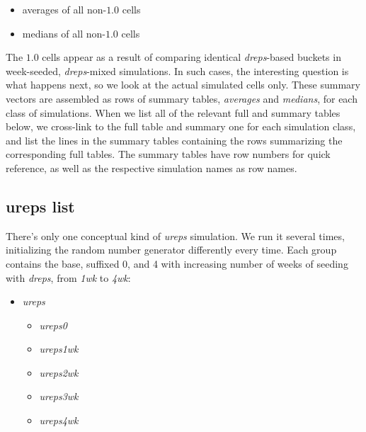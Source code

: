 \documentclass[10pt,oneside]{memoir}
\begin{document}
\begin{Spacing}{2}
\begin{itemize}


\item averages of all non-$1.0$ cells

\item medians of all non-$1.0$ cells
\end{itemize}

The $1.0$ cells appear as a result of comparing identical {\itshape dreps}-based buckets in week-seeded, {\itshape dreps}-mixed simulations.  In such cases, the interesting question is what happens next, so we look at the actual simulated cells only.  These summary vectors are assembled as rows of summary tables, {\itshape averages} and {\itshape medians}, for each class of simulations.  When we list all of the relevant full and summary tables below, we cross-link to the full table and summary one for each simulation class, and list the lines in the summary tables containing the rows summarizing the corresponding full tables.  The summary tables have row numbers for quick reference, as well as the respective simulation names as row names.


\subsection{ureps list}
\label{urepslist}

There's only one conceptual kind of {\itshape ureps} simulation.  We run it several times, initializing the random number generator differently every time.  Each group contains the base, suffixed $0$, and 4 with increasing number of weeks of seeding with {\itshape dreps}, from {\itshape 1wk} to {\itshape 4wk}:


\begin{itemize}


\item {\itshape ureps}\begin{itemize}


\item {\itshape ureps0}

\item {\itshape ureps1wk}

\item {\itshape ureps2wk}

\item {\itshape ureps3wk}

\item {\itshape ureps4wk}
\end{itemize}



\end{itemize}
\end{Spacing}
\end{document}
